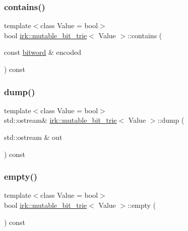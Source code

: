 \subsubsection{\texorpdfstring{contains()}{contains()}}
{\footnotesize\ttfamily template$<$class Value = bool$>$ \\
bool \mbox{\hyperlink{classirk_1_1mutable__bit__trie}{irk\+::mutable\+\_\+bit\+\_\+trie}}$<$ Value $>$\+::contains (\begin{DoxyParamCaption}\item[{const \mbox{\hyperlink{namespaceirk_a5d1a67079cf6423ecaededebe848f083}{bitword}} \&}]{encoded }\end{DoxyParamCaption}) const\hspace{0.3cm}{\ttfamily [inline]}}

\mbox{\label{classirk_1_1mutable__bit__trie_ac97dbb665a28127d1e2a3e0d6fbcae66}} 
\subsubsection{\texorpdfstring{dump()}{dump()}}
{\footnotesize\ttfamily template$<$class Value = bool$>$ \\
std\+::ostream\& \mbox{\hyperlink{classirk_1_1mutable__bit__trie}{irk\+::mutable\+\_\+bit\+\_\+trie}}$<$ Value $>$\+::dump (\begin{DoxyParamCaption}\item[{std\+::ostream \&}]{out }\end{DoxyParamCaption}) const\hspace{0.3cm}{\ttfamily [inline]}}

\mbox{\label{classirk_1_1mutable__bit__trie_abbfbe73cb98af4bb0375f00229cec50a}} 
\subsubsection{\texorpdfstring{empty()}{empty()}}
{\footnotesize\ttfamily template$<$class Value = bool$>$ \\
bool \mbox{\hyperlink{classirk_1_1mutable__bit__trie}{irk\+::mutable\+\_\+bit\+\_\+trie}}$<$ Value $>$\+::empty (\begin{DoxyParamCaption}{ }\end{DoxyParamCaption}) const\hspace{0.3cm}{\ttfamily [inline]}}

